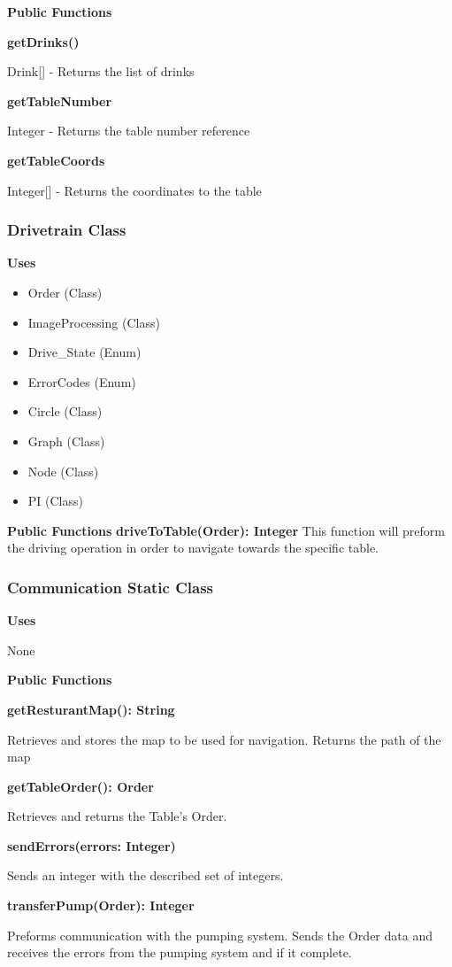 \documentclass [10pt]{article}
\begin{document}
\textbf{Public Functions}

\textbf{getDrinks()}

Drink[] - Returns the list of drinks

\textbf{getTableNumber}

 Integer - Returns the table number reference

\textbf{getTableCoords}

 Integer[] - Returns the coordinates to the table

\subsubsection{Drivetrain Class}
\textbf{Uses}
\begin{itemize}
	\item Order (Class)
	\item ImageProcessing (Class)
	\item Drive\_State (Enum)
	\item ErrorCodes (Enum)
	\item Circle (Class)
	\item Graph (Class)
	\item Node (Class)
	\item PI (Class)
\end{itemize}

\textbf{Public Functions}
\textbf{driveToTable(Order): Integer}
This function will preform the driving operation in order to navigate towards the specific table.

\subsubsection{Communication Static Class}
\textbf{Uses}

None 

\textbf{Public Functions}

\textbf{getResturantMap(): String}

Retrieves and stores the map to be used for navigation. Returns the path of the map 

\textbf{getTableOrder(): Order}

Retrieves and returns the Table's Order.

\textbf{sendErrors(errors: Integer)}

Sends an integer with the described set of integers. 

\textbf{transferPump(Order): Integer}

Preforms communication with the pumping system. Sends the Order data and receives the errors from the pumping system and if it complete.
\end{document}
